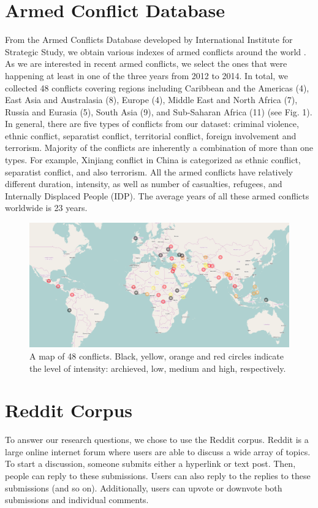 \section{Armed Conflict Database}
From the Armed Conflicts Database developed by International Institute for Strategic Study, we obtain various indexes of armed conflicts around the world \cite{(conflictDB)}. As we are interested in recent armed conflicts, we select the ones that were happening at least in one of the three years from 2012 to 2014. In total, we collected 48 conflicts covering regions including Caribbean and the Americas (4), East Asia and Australasia (8), Europe (4), Middle East and North Africa (7), Russia and Eurasia (5), South Asia (9), and Sub-Saharan Africa (11) (see Fig. 1). In general, there are five types of conflicts from our dataset: criminal violence, ethnic conflict, separatist conflict, territorial conflict, foreign involvement and terrorism. Majority of the conflicts are inherently a combination of more than one types. For example, Xinjiang conflict in China is categorized as ethnic conflict, separatist conflict, and also terrorism. All the armed conflicts have relatively different duration, intensity, as well as number of casualties, refugees, and Internally Displaced People (IDP). The average years of all these armed conflicts worldwide is 23 years.

\begin{figure}
\centering
\includegraphics[width=0.9\columnwidth]{map.png}
\caption{A map of 48 conflicts. Black, yellow, orange and red circles indicate the level of intensity: archieved, low, medium and high, respectively.}
\label{rot}
\end{figure}

\section{Reddit Corpus}
To answer our research questions, we chose to use the Reddit corpus. Reddit is a large online internet forum where users are able to discuss a wide array of  topics. To start a discussion, someone submits either a hyperlink or text post. Then, people can reply to these submissions. Users can also reply to the replies to these submissions (and so on). Additionally, users can upvote or downvote both submissions and individual comments. 

